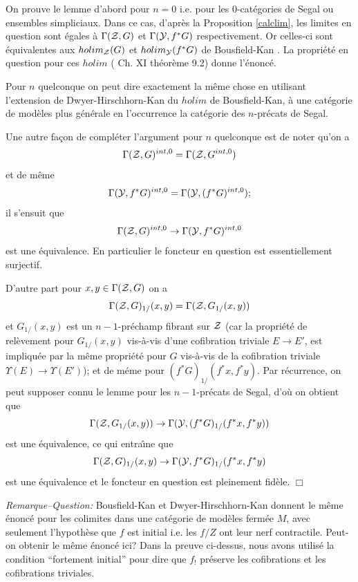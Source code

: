 \documentclass[12pt]{article}
\newcommand{\eop}{\hfill $\Box$\vspace{.1in}}
\newcommand{\Yy}{{\cal Y}}
\newcommand{\Zz}{{\cal Z}}
\begin{document}
On prouve le lemme d'abord pour $n=0$ i.e. pour les $0$-cat\'egories de Segal ou
ensembles simpliciaux. Dans ce cas, d'apr\`es la Proposition \ref{calclim}, les
limites en question sont \'egales \`a $\Gamma (\Zz , G)$ et
$\Gamma (\Yy , f^{\ast}G)$ respectivement. Or celles-ci sont \'equivalentes aux
$holim_{\Zz}(G)$ et
$holim_{\Yy}(f^{\ast}G)$ de Bousfield-Kan \cite{BousfieldKan}.
La propri\'et\'e en question pour ces $holim$
(\cite{BousfieldKan} Ch. XI th\'eor\`eme 9.2) donne
l'\'enonc\'e.

Pour $n$ quelconque on peut dire exactement la m\^eme chose en utilisant
l'extension de Dwyer-Hirschhorn-Kan du $holim$ de Bousfield-Kan, \`a une
cat\'egorie de mod\`eles plus g\'en\'erale en l'occurrence la cat\'egorie des
$n$-pr\'ecats de Segal.

Une autre fa\c{c}on de compl\'eter l'argument pour $n$ quelconque
est de noter qu'on a
$$
\Gamma (\Zz , G)^{int, 0}=
\Gamma (\Zz , G^{int, 0})
$$
et de m\^eme
$$
\Gamma (\Yy , f^{\ast}G)^{int, 0}=
\Gamma (\Yy , (f^{\ast}G)^{int, 0});
$$
il s'ensuit que
$$
\Gamma (\Zz , G)^{int, 0}\rightarrow
\Gamma (\Yy , f^{\ast}G)^{int, 0}
$$
est une \'equivalence. En particulier le foncteur en question est
essentiellement surjectif.

D'autre part pour $x,y\in \Gamma (\Zz , G)$ on a
$$
\Gamma (\Zz , G)_{1/}(x,y) =
\Gamma (\Zz , G_{1/}(x,y))
$$
et $G_{1/}(x,y)$ est un $n-1$-pr\'echamp fibrant sur $\Zz$ (car
la propri\'et\'e de
rel\`evement pour $G_{1/}(x,y)$
vis-\`a-vis d'une cofibration triviale $E\rightarrow E'$,
est impliqu\'ee par la m\^eme propri\'et\'e
pour $G$ vis-\`a-vis de la cofibration triviale $\Upsilon
(E)\rightarrow \Upsilon (E')$); et
de m\'eme pour $(f^{\ast}G )_{1/}(f^{\ast}x, f^{\ast}y)$.  Par r\'ecurrence,
on peut
supposer connu le lemme pour les $n-1$-pr\'ecats de Segal,
d'o\`u on obtient que
$$
\Gamma (\Zz , G_{1/}(x,y))\rightarrow \Gamma (\Yy , (f^{\ast}G)_{1/}(f^{\ast}x,
f^{\ast}y))
$$
est une \'equivalence, ce qui entra\^{\i}ne que
$$
\Gamma (\Zz , G)_{1/}(x,y)\rightarrow
\Gamma (\Yy , f^{\ast}G)_{1/}(f^{\ast}x, f^{\ast}y)
$$
est une \'equivalence et le foncteur en question est pleinement fid\`ele.
\eop

{\em Remarque--Question:}
Bousfield-Kan et Dwyer-Hirschhorn-Kan donnent le m\^eme \'e\-non\-c\'e pour les
colimites
dans une cat\'egorie de mod\`eles ferm\'ee $M$, avec seulement l'hypoth\`ese que
$f$ est initial i.e. les $f/Z$ ont leur
nerf contractile. Peut-on obtenir le m\^eme
\'enonc\'e ici? Dans la preuve ci-dessus, nous avons utilis\'e la condition
``fortement initial'' pour dire que $f_!$ pr\'eserve les cofibrations et
les cofibrations triviales.
\end{document}
